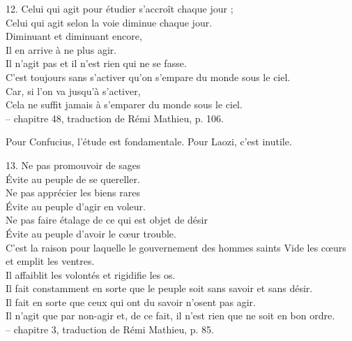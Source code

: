 \begin{singlequote}
    12.	Celui qui agit pour étudier s’accroît chaque jour ; \\Celui qui agit selon la voie diminue chaque jour. \\Diminuant et diminuant encore,\\
Il en arrive à ne plus agir.\\
Il n’agit pas et il n’est rien qui ne se fasse.\\
C’est toujours sans s’activer qu’on s’empare du monde sous le ciel. \\Car, si l’on va jusqu’à s’activer,\\
Cela ne suffit jamais à s’emparer du monde sous le ciel.\\
-- chapitre 48, traduction de Rémi Mathieu, p. 106.
\end{singlequote}

Pour Confucius, l'étude est fondamentale. Pour Laozi, c'est inutile.

\begin{singlequote}
    13.	Ne pas promouvoir de sages \\Évite au peuple de se quereller. \\Ne pas apprécier les biens rares \\Évite au peuple d’agir en voleur.\\
Ne pas faire étalage de ce qui est objet de désir\\ Évite au peuple d’avoir le cœur trouble.\\
C’est la raison pour laquelle le gouvernement des hommes saints Vide les cœurs et emplit les ventres.\\
Il affaiblit les volontés et rigidifie les os.\\
Il fait constamment en sorte que le peuple soit sans savoir et sans désir.\\ Il fait en sorte que ceux qui ont du savoir n’osent pas agir.\\
Il n’agit que par non-agir et, de ce fait, il n’est rien que ne soit en bon ordre.\\
-- chapitre 3, traduction de Rémi Mathieu, p. 85.
\end{singlequote}

